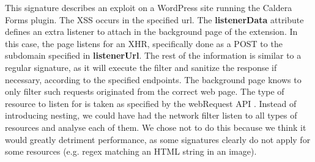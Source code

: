 This signature describes an exploit on a WordPress site running the Caldera Forms plugin. The XSS occurs in the specified url. The \textbf{listenerData} attribute defines an extra listener to attach in the background page of the extension. In this case, the page listens for an XHR, specifically done as a POST to the subdomain specified in \textbf{listenerUrl}. The rest of the information is similar to a regular signature, as it will execute the filter and sanitize the response if necessary, according to the specified endpoints. The background page knows to only filter such requests originated from the correct web page. The type of resource to listen for is taken as specified by the webRequest API \cite{webRequest}. Instead of introducing nesting, we could have had the network filter listen to all types of resources and analyse each of them. We chose not to do this because we think it would greatly detriment performance, as some signatures clearly do not apply for some resources (e.g. regex matching an HTML string in an image).

